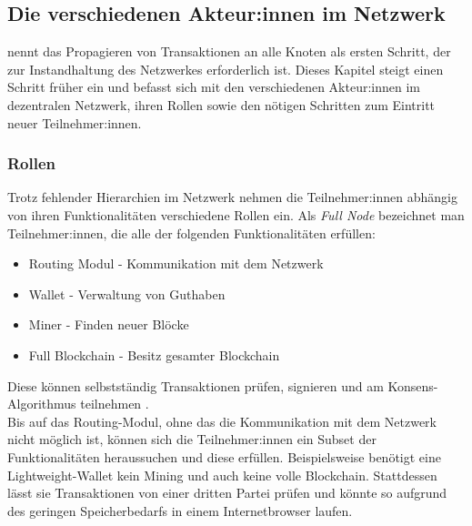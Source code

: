 \subsection{Die verschiedenen Akteur:innen im Netzwerk}
\cite{nakamoto_whitepaper_2008} nennt das Propagieren von Transaktionen an alle Knoten als ersten Schritt, der zur Instandhaltung des Netzwerkes erforderlich ist. Dieses Kapitel steigt einen Schritt früher ein und befasst sich mit den verschiedenen Akteur:innen im dezentralen Netzwerk, ihren Rollen sowie den nötigen Schritten zum Eintritt neuer Teilnehmer:innen.
\subsubsection{Rollen}
Trotz fehlender Hierarchien im Netzwerk nehmen die Teilnehmer:innen abhängig von ihren Funktionalitäten verschiedene Rollen ein. Als \emph{Full Node} bezeichnet man Teilnehmer:innen, die alle der folgenden Funktionalitäten erfüllen:
\begin{itemize}
	\item Routing Modul - Kommunikation mit dem Netzwerk
	\item Wallet - Verwaltung von Guthaben
	\item Miner - Finden neuer Blöcke
	\item Full Blockchain - Besitz gesamter Blockchain
\end{itemize}
Diese können selbstständig Transaktionen prüfen, signieren und am Konsens-Algorithmus teilnehmen \cite[S. 169/170]{antanopoulos_2014}.\\

Bis auf das Routing-Modul, ohne das die Kommunikation mit dem Netzwerk nicht möglich ist, können sich die Teilnehmer:innen ein Subset der Funktionalitäten heraussuchen und diese erfüllen. 
Beispielsweise benötigt eine Lightweight-Wallet kein Mining und auch keine volle Blockchain. 
Stattdessen lässt sie Transaktionen von einer dritten Partei prüfen und könnte so aufgrund des geringen Speicherbedarfs in einem Internetbrowser laufen.

